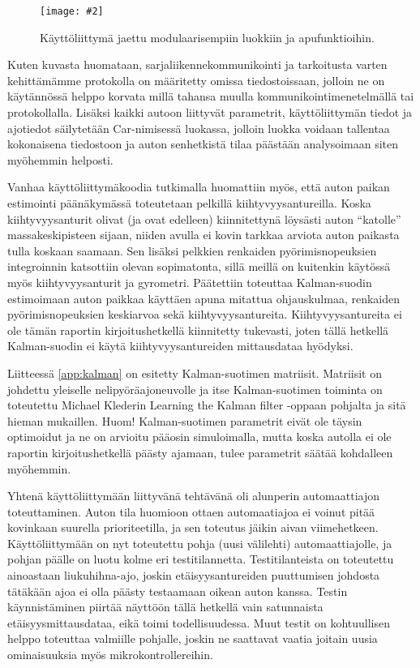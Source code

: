 \documentclass{article}
\newcommand{\kuvaa}[4]{%
	\begin{figure}[h]%
		\centering \texttt{[image: \#2]}%
		\caption{#3 \label{fig:#4}}%
	\end{figure}%
}
\begin{document}
\kuvaa{0.6}{gui_tiedostolistaus}{Käyttöliittymä jaettu modulaarisempiin luokkiin ja apufunktioihin.}{guitiedostot}

Kuten kuvasta huomataan, sarjaliikennekommunikointi ja tarkoitusta varten kehittämämme protokolla on määritetty omissa tiedostoissaan, jolloin ne on käytännössä helppo korvata millä tahansa muulla kommunikointimenetelmällä tai protokollalla. Lisäksi kaikki autoon liittyvät parametrit, käyttöliittymän tiedot ja ajotiedot säilytetään Car-nimisessä luokassa, jolloin luokka voidaan tallentaa kokonaisena tiedostoon ja auton senhetkistä tilaa päästään analysoimaan siten myöhemmin helposti.

Vanhaa käyttöliittymäkoodia tutkimalla huomattiin myös, että auton paikan estimointi päänäkymässä toteutetaan pelkillä kiihtyvyysantureilla. Koska kiihtyvyysanturit olivat (ja ovat edelleen) kiinnitettynä löysästi auton ``katolle'' massakeskipisteen sijaan, niiden avulla ei kovin tarkkaa arviota auton paikasta tulla koskaan saamaan. Sen lisäksi pelkkien renkaiden pyörimisnopeuksien integroinnin katsottiin olevan sopimatonta, sillä meillä on kuitenkin käytössä myös kiihtyvyysanturit ja gyrometri. Päätettiin toteuttaa Kalman-suodin estimoimaan auton paikkaa käyttäen apuna mitattua ohjauskulmaa, renkaiden pyörimisnopeuksien keskiarvoa sekä kiihtyvyysantureita. Kiihtyvyysantureita ei ole tämän raportin kirjoitushetkellä kiinnitetty tukevasti, joten tällä hetkellä Kalman-suodin ei käytä kiihtyvyysantureiden mittausdataa hyödyksi.

Liitteessä \ref{app:kalman} on esitetty Kalman-suotimen matriisit. Matriisit on johdettu yleiselle nelipyöräajoneuvolle ja itse Kalman-suotimen toiminta on toteutettu Michael Klederin Learning the Kalman filter \cite{bib:kalman} -oppaan pohjalta ja sitä hieman mukaillen. Huom! Kalman-suotimen parametrit eivät ole täysin optimoidut ja ne on arvioitu pääosin simuloimalla, mutta koska autolla ei ole raportin kirjoitushetkellä päästy ajamaan, tulee parametrit säätää kohdalleen myöhemmin.

Yhtenä käyttöliittymään liittyvänä tehtävänä oli alunperin automaattiajon toteuttaminen. Auton tila huomioon ottaen automaatiajoa ei voinut pitää kovinkaan suurella prioriteetilla, ja sen toteutus jäikin aivan viimehetkeen. Käyttöliittymään on nyt toteutettu pohja (uusi välilehti) automaattiajolle, ja pohjan päälle on luotu kolme eri testitilannetta. Testitilanteista on toteutettu ainoastaan liukuhihna-ajo, joskin etäisyysantureiden puuttumisen johdosta tätäkään ajoa ei olla päästy testaamaan oikean auton kanssa. Testin käynnistäminen piirtää näyttöön tällä hetkellä vain satunnaista etäisyysmittausdataa, eikä toimi todellisuudessa. Muut testit on kohtuullisen helppo toteuttaa valmiille pohjalle, joskin ne saattavat vaatia joitain uusia ominaisuuksia myös mikrokontrollereihin.
\end{document}
